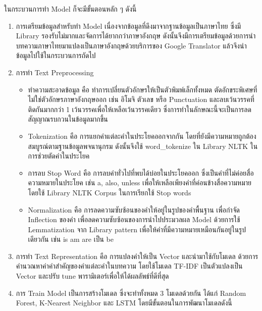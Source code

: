 \documentclass[12pt,oneside,openright,a4paper]{cpe-thai-project}
\begin{document}
\begin{itemize}
  \hspace{1cm}ในกระบวนการทำ Model ก็จะมีขั้นตอนหลัก ๆ ดังนี้
  \begin{enumerate}
    \item การเตรียมข้อมูลสำหรับทำ Model
          \newline\hspace*{1cm}เนื่องจากข้อมูลที่ดึงมาจากฐานข้อมูลเป็นภาษาไทย ซึ่งมี Library รองรับไม่มากและจัดการได้ยากกว่าภาษาอังกฤษ 
          ดังนั้นจึงมีการเตรียมข้อมูลด้วยการนำบทความภาษาไทยมาแปลงเป็นภาษาอังกฤษด้วยบริการของ Google Translator แล้วจึงนำข้อมูลไปใช้ในกระบวนการถัดไป
    \item การทำ Text Preprocessing
          \begin{itemize}
            \item ทำความสะอาดข้อมูล คือ ทำการเปลี่ยนตัวอักษรให้เป็นตัวพิมพ์เล็กทั้งหมด ตัดอักขระพิเศษที่ไม่ใช่ตัวอักษรภาษาอังกฤษออก เช่น อิโมจิ ตัวเลข หรือ Punctuation 
            และลบเว้นวรรคที่ติดกันมากกว่า 1 เว้นวรรคเพื่อให้เหลือเว้นวรรคเดียว ซึ่งการทําในลักษณะนี้จะเป็นการลดสัญญาณรบกวนในข้อมูลมากขึ้น
            \item Tokenization คือ การแยกคำแต่ละคำในประโยคออกจากกัน โดยที่ยังมีความหมายถูกต้องสมบูรณ์ตามฐานข้อมูลพจนานุกรม 
            ดังนั้นจึงใช้ word\_tokenize ใน Library NLTK ในการช่วยตัดคำในประโยค
            \item การลบ Stop Word คือ การลบคำทั่วไปที่พบได้บ่อยในประโยคออก ซึ่งเป็นคำที่ไม่ค่อยสื่อความหมายในประโยค เช่น a, also, unless 
            เพื่อให้เหลือเพียงคำที่ค่อนข้างสื่อความหมาย โดยใช้ Library NLTK Corpus ในการเรียกใช้ Stop words
            \item Normalization คือ การลดความซับซ้อนของคำให้อยู่ในรูปของคำพื้นฐาน เพื่อกำจัด Inflection ของคำ 
            เพื่อลดความซับซ้อนของการนำไปประมวลผล Model ด้วยการใช้ Lemmatization จาก Library pattern 
            เพื่อให้คำที่มีความหมายเหมือนกันอยู่ในรูปเดียวกัน เช่น is am are เป็น be
          \end{itemize}
    \item การทำ Text Representation คือ การแปลงคำให้เป็น Vector และนำมาใช้กับโมเดล ด้วยการคำนวณหาค่าคำสำคัญของคำแต่ละคำในบทความ 
          โดยใช้โมเดล TF-IDF เป็นตัวแปลงเป็น Vector และปรับ tune พารามิเตอร์เพื่อให้ได้ผลลัพธ์ที่ดีที่สุด
    \item การ Train Model
          \newline\hspace*{1cm}เป็นการสร้างโมเดล ซึ่งจะทำทั้งหมด 3 โมเดลด้วยกัน ได้แก่ Random Forest, K-Nearest Neighbor และ LSTM
          โดยมีขั้นตอนในการพัฒนาโมเดลดังนี้

\end{enumerate}
\end{itemize}
\end{document}
